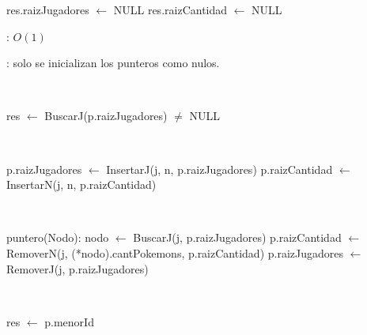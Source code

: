 \begin{Algoritmos}

	\begin{algorithm}[H]
		\NoCaptionOfAlgo
		\caption{}
		res.raizJugadores $\leftarrow$ NULL
		res.raizCantidad $\leftarrow$ NULL
	\end{algorithm}

	\complejidad: $O(1)$

	\justifcomp: solo se inicializan los punteros como nulos.

	~

	\begin{algorithm}[H]
		\NoCaptionOfAlgo
		\caption{}
		res $\leftarrow$ BuscarJ(p.raizJugadores) $\neq$ NULL
	\end{algorithm}

	~

	\begin{algorithm}[H]
		\NoCaptionOfAlgo
		\caption{}
		p.raizJugadores $\leftarrow$ InsertarJ(j, n, p.raizJugadores)
		p.raizCantidad $\leftarrow$ InsertarN(j, n, p.raizCantidad)
	\end{algorithm}

	~

	\begin{algorithm}[H]
		\NoCaptionOfAlgo
		\caption{}
		puntero(Nodo): nodo $\leftarrow$ BuscarJ(j, p.raizJugadores)
		p.raizCantidad $\leftarrow$ RemoverN(j, (*nodo).cantPokemons, p.raizCantidad)
		p.raizJugadores $\leftarrow$ RemoverJ(j, p.raizJugadores)
	\end{algorithm}

	~

	\begin{algorithm}[H]
		\NoCaptionOfAlgo
		\caption{}
		res $\leftarrow$ p.menorId
	\end{algorithm}


\end{Algoritmos}
